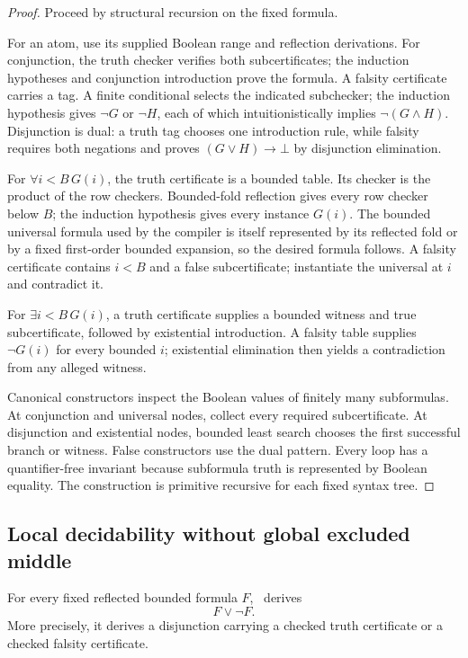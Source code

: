\begin{proof}
Proceed by structural recursion on the fixed formula.

For an atom, use its supplied Boolean range and reflection derivations.  For conjunction, the truth checker verifies both subcertificates; the induction hypotheses and conjunction introduction prove the formula.  A falsity certificate carries a tag.  A finite conditional selects the indicated subchecker; the induction hypothesis gives \(\neg G\) or \(\neg H\), each of which intuitionistically implies \(\neg(G\wedge H)\).  Disjunction is dual: a truth tag chooses one introduction rule, while falsity requires both negations and proves \((G\vee H)\to\bot\) by disjunction elimination.

For \(\forall i<B\,G(i)\), the truth certificate is a bounded table.  Its checker is the product of the row checkers.  Bounded-fold reflection gives every row checker below \(B\); the induction hypothesis gives every instance \(G(i)\).  The bounded universal formula used by the compiler is itself represented by its reflected fold or by a fixed first-order bounded expansion, so the desired formula follows.  A falsity certificate contains \(i<B\) and a false subcertificate; instantiate the universal at \(i\) and contradict it.

For \(\exists i<B\,G(i)\), a truth certificate supplies a bounded witness and true subcertificate, followed by existential introduction.  A falsity table supplies \(\neg G(i)\) for every bounded \(i\); existential elimination then yields a contradiction from any alleged witness.

Canonical constructors inspect the Boolean values of finitely many subformulas.  At conjunction and universal nodes, collect every required subcertificate.  At disjunction and existential nodes, bounded least search chooses the first successful branch or witness.  False constructors use the dual pattern.  Every loop has a quantifier-free invariant because subformula truth is represented by Boolean equality.  The construction is primitive recursive for each fixed syntax tree.
\end{proof}

\subsection{Local decidability without global excluded middle}

\begin{corollary}\label{cor:bounded-decision}
For every fixed reflected bounded formula \(F\), \iPRA\ derives
\[
              F\vee\neg F.
\]
More precisely, it derives a disjunction carrying a checked truth certificate or a checked falsity certificate.
\end{corollary}

